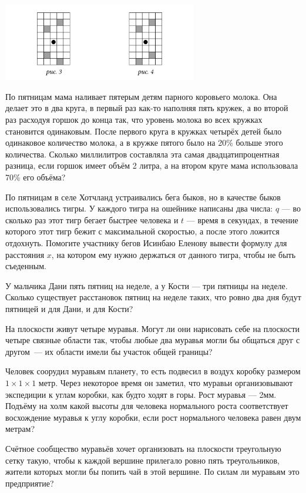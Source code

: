 \begin{center}
  \includegraphics[width=8.5cm]{stats/2016/Figures/Corbleud.png}
\end{center}

\begin{itemize}
\itA По пятницам мама наливает пятерым детям парного коровьего молока. Она делает это в два круга, в первый раз как-то наполняя пять кружек, а во второй раз расходуя горшок до конца так, что уровень молока во всех кружках становится одинаковым. После первого круга в кружках четырёх детей было одинаковое количество молока, а в кружке пятого было на 20\% больше этого количества. Сколько миллилитров составляла эта самая двадцатипроцентная разница, если горшок имеет объём 2 литра, а на втором круге мама использовала 70\% его объёма?

\itB По пятницам в селе Хотчланд устраивались бега быков, но в качестве быков использовались тигры. У каждого тигра на ошейнике написаны два числа: $q$ — во сколько раз этот тигр бегает быстрее человека и $t$ — время в секундах, в течение которого этот тигр бежит с максимальной скоростью, а после этого ложится отдохнуть. Помогите участнику бегов Исинбаю Еленову вывести формулу для расстояния $x$, на котором ему нужно держаться от данного тигра, чтобы не быть съеденным.

\itC У мальчика Дани пять пятниц на неделе, а у Кости — три пятницы на неделе. Сколько существует расстановок пятниц на неделе таких, что ровно два дня будут пятницей и для Дани, и для Кости?
\end{itemize}

\begin{itemize}
\itA На плоскости живут четыре муравья. Могут ли они нарисовать себе на плоскости четыре связные области так, чтобы любые два муравья могли бы общаться друг с другом~— их области имели бы участок общей границы?

\itB Человек соорудил муравьям планету, то есть подвесил в воздух коробку размером $1 \times 1 \times 1$ метр. Через некоторое время он заметил, что муравьи организовывают экспедиции к углам коробки, как будто ходят в горы. Рост муравья — 2мм. Подъёму на холм какой высоты для человека нормального роста соответствует восхождение муравья к углу коробки, если рост нормального человека равен двум метрам?

\itC Счётное сообщество муравьёв хочет организовать на плоскости треугольную сетку такую, чтобы к каждой вершине прилегало ровно пять треугольников, жители которых могли бы попить чай в этой вершине. По силам ли муравьям это предприятие?
\end{itemize}

